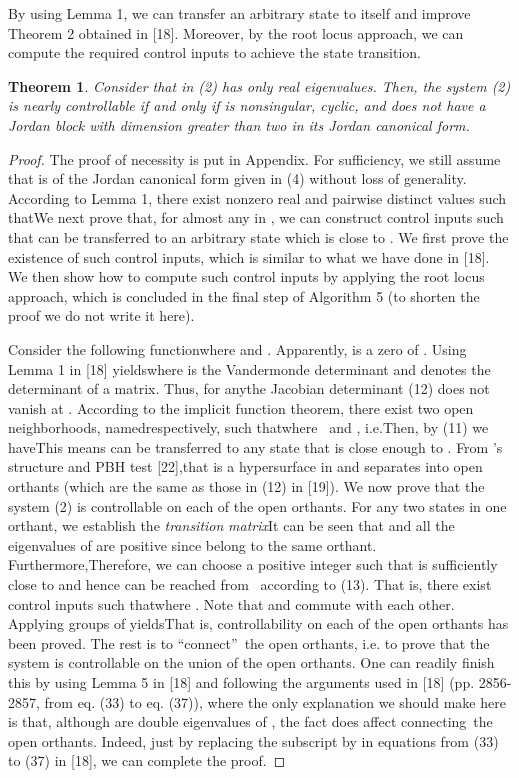 \documentclass[journal,a4paper,12pt,onecolumn]{IEEEtran}
\newtheorem{theorem}{Theorem}
\begin{document}
By using Lemma 1, we can transfer an arbitrary state to itself and improve
Theorem 2 obtained in [18]. Moreover, by the root locus approach, we can
compute the required control inputs to achieve the state transition.



\begin{theorem}
Consider that  in (2) has only real eigenvalues. Then, the system (2) is
nearly controllable if and only if  is nonsingular, cyclic, and does not
have a Jordan block with dimension greater than two in its Jordan canonical
form.
\end{theorem}

\begin{proof}
The proof of necessity is put in Appendix. For sufficiency, we still assume
that  is of the Jordan canonical form given in (4) without loss of
generality. According to Lemma 1, there exist  nonzero
real and pairwise distinct values 
such thatWe next prove that, for almost any  in , we can construct control inputs such that  can be transferred
to an arbitrary state which is close to . We first prove the existence
of such control inputs, which is similar to what we have done in [18]. We
then show how to compute such control inputs by applying the root locus
approach, which is concluded in the final step of Algorithm 5 (to shorten
the proof we do not write it here).

Consider the following functionwhere  and . Apparently,  is a zero of . Using Lemma 1 in [18] yieldswhere  is the Vandermonde determinant and 
denotes the determinant of a matrix. Thus, for anythe Jacobian determinant (12) does not vanish at . According to the implicit function
theorem, there exist two open neighborhoods, namedrespectively, such thatwhere  \ and , i.e.Then, by (11) we haveThis means  can be transferred to any state that is close enough to . From 's structure and PBH test [22],that is a hypersurface in  and separates  into  open orthants (which are the same as those in (12) in
[19]). We now prove that the system (2) is controllable on each of the  open orthants. For any two states  in one orthant, we
establish the \textit{transition} \textit{matrix}It can be seen that  and all the
eigenvalues of  are positive since 
belong to the same orthant. Furthermore,Therefore, we can choose a positive integer  such that  is sufficiently close to  and
hence can be reached from \ according to (13). That is, there exist
control inputs 
such thatwhere . Note that  and  commute with each other. Applying  groups of  yieldsThat is, controllability on each of the  open orthants has been
proved. The rest is to \textquotedblleft connect\textquotedblright\ the  open orthants, i.e. to prove that the system is controllable on the
union of the  open orthants. One can readily finish this by using
Lemma 5 in [18] and following the arguments used in [18] (pp. 2856-2857,
from eq. (33) to eq. (37)), where the only explanation we should make here
is that, although  are double eigenvalues
of , the fact does affect connecting\ the  open orthants. Indeed,
just by replacing the subscript  by  in equations from (33) to (37) in
[18], we can complete the proof.


\end{proof}
\end{document}
